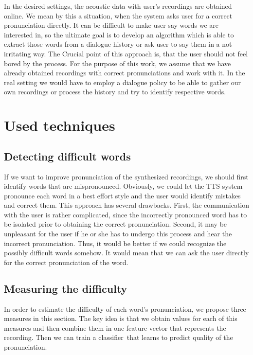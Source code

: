 In the desired settings, the acoustic data with user's recordings are obtained online.
We mean by this a situation, when the system asks user for a correct pronunciation directly.
It can be difficult to make user say words we are interested in, so the ultimate goal is to develop an algorithm which is able to extract those words from a dialogue history or ask user to say them in a not irritating way.
The Crucial point of this approach is, that the user should not feel bored by the process. For the purpose of this work, we assume that we have already obtained recordings with correct pronunciations and work with it.
In the real setting we would have to employ a dialogue policy to be able to gather our own recordings or process the history and try to identify respective words.
\section{Used techniques}
\subsection{Detecting difficult words}
\label{ident-diff}
If we want to improve pronunciation of the synthesized recordings, we should first identify words that are mispronounced. Obviously, we could let the TTS system pronounce each word in a best effort style and  the user would identify mistakes and correct them. This approach has several drawbacks. First, the communication with the user is rather complicated, since the incorrectly pronounced word has to be isolated prior to obtaining the correct pronunciation.
Second, it may be unpleasant for the user if he or she has to undergo this process and hear the incorrect pronunciation. Thus, it would be better if we could recognize the possibly difficult words somehow. It would mean that we can ask the user directly for the correct pronunciation of the word.
\subsection{Measuring the difficulty}
In order to estimate the difficulty of each word's pronunciation, we propose three measures in this section. The key idea is that we obtain values for each of this measures and then combine them in one feature vector that represents the recording.
Then we can train a classifier\ that learns to predict quality of the pronunciation.
